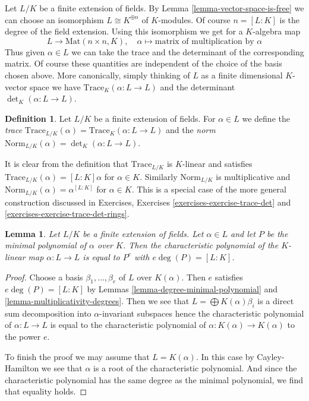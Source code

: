 \documentclass{stacks-project}
\theoremstyle{plain}
\newtheorem{lemma}[subsection]{Lemma}
\theoremstyle{definition}
\newtheorem{definition}[subsection]{Definition}
\theoremstyle{remark}
\numberwithin{equation}{subsection}
\begin{document}
\noindent
Let $L/K$ be a finite extension of fields. By
Lemma \ref{lemma-vector-space-is-free}
we can choose an isomorphism $L \cong K^{\oplus n}$ of $K$-modules.
Of course $n = [L : K]$ is the degree of the field extension.
Using this isomorphism we get for a $K$-algebra map
$$
L \longrightarrow \text{Mat}(n \times n, K),\quad
\alpha \longmapsto \text{matrix of multiplication by }\alpha
$$
Thus given $\alpha \in L$ we can take the trace and the determinant
of the corresponding matrix. Of course these quantities are independent
of the choice of the basis chosen above. More canonically, simply thinking
of $L$ as a finite dimensional $K$-vector space we have
$\text{Trace}_K(\alpha : L \to L)$ and the determinant
$\det_K(\alpha : L \to L)$.

\begin{definition}
\label{definition-trace-norm}
Let $L/K$ be a finite extension of fields. For $\alpha \in L$ we define
the {\it trace}
$\text{Trace}_{L/K}(\alpha) = \text{Trace}_K(\alpha : L \to L)$
and the {\it norm}
$\text{Norm}_{L/K}(\alpha) = \det_K(\alpha : L \to L)$.
\end{definition}

\noindent
It is clear from the definition that
$\text{Trace}_{L/K}$ is $K$-linear and satisfies
$\text{Trace}_{L/K}(\alpha) = [L : K]\alpha$ for $\alpha \in K$.
Similarly $\text{Norm}_{L/K}$ is multiplicative and
$\text{Norm}_{L/K}(\alpha) = \alpha^{[L : K]}$ for $\alpha \in K$.
This is a special case of the more general construction discussed
in Exercises, Exercises \ref{exercises-exercise-trace-det} and
\ref{exercises-exercise-trace-det-rings}.

\begin{lemma}
\label{lemma-characteristic-vs-minimal-polynomial}
Let $L/K$ be a finite extension of fields. Let $\alpha \in L$ and let $P$
be the minimal polynomial of $\alpha$ over $K$. Then the characteristic
polynomial of the $K$-linear map $\alpha : L \to L$ is equal to
$P^e$ with $e \deg(P) = [L : K]$.
\end{lemma}

\begin{proof}
Choose a basis $\beta_1, \ldots, \beta_e$ of $L$ over $K(\alpha)$.
Then $e$ satisfies $e \deg(P) = [L : K]$ by
Lemmas \ref{lemma-degree-minimal-polynomial} and
\ref{lemma-multiplicativity-degrees}.
Then we see that $L = \bigoplus K(\alpha) \beta_i$ is a
direct sum decomposition into $\alpha$-invariant subspaces
hence the characteristic polynomial of $\alpha : L \to L$
is equal to the characteristic polynomial of
$\alpha : K(\alpha) \to K(\alpha)$ to the power $e$.

\medskip\noindent
To finish the proof we may assume that $L = K(\alpha)$.
In this case by Cayley-Hamilton we see that $\alpha$
is a root of the characteristic polynomial. And since the
characteristic polynomial has the same degree as the minimal
polynomial, we find that equality holds.
\end{proof}
\end{document}
